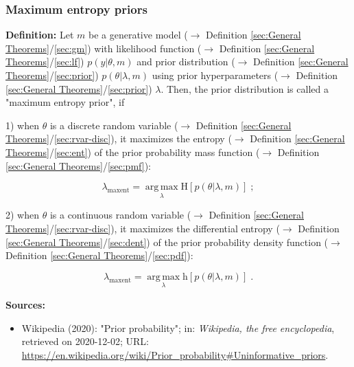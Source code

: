 \documentclass[a4paper,12pt,twoside]{book}
\begin{document}
\subsubsection[\textit{Maximum entropy priors}]{Maximum entropy priors} \label{sec:prior-maxent}
\setcounter{equation}{0}

\textbf{Definition:} Let $m$ be a generative model ($\rightarrow$ Definition \ref{sec:General Theorems}/\ref{sec:gm}) with likelihood function ($\rightarrow$ Definition \ref{sec:General Theorems}/\ref{sec:lf}) $p(y \vert \theta, m)$ and prior distribution ($\rightarrow$ Definition \ref{sec:General Theorems}/\ref{sec:prior}) $p(\theta \vert \lambda, m)$ using prior hyperparameters ($\rightarrow$ Definition \ref{sec:General Theorems}/\ref{sec:prior}) $\lambda$. Then, the prior distribution is called a "maximum entropy prior", if

1) when $\theta$ is a discrete random variable ($\rightarrow$ Definition \ref{sec:General Theorems}/\ref{sec:rvar-disc}), it maximizes the entropy ($\rightarrow$ Definition \ref{sec:General Theorems}/\ref{sec:ent}) of the prior probability mass function ($\rightarrow$ Definition \ref{sec:General Theorems}/\ref{sec:pmf}):

\begin{equation} \label{eq:prior-maxent-prior-maxent-disc}
\lambda_{\mathrm{maxent}} = \operatorname*{arg\,max}_{\lambda} \mathrm{H}\left[ p(\theta \vert \lambda, m) \right] \; ;
\end{equation}

2) when $\theta$ is a continuous random variable ($\rightarrow$ Definition \ref{sec:General Theorems}/\ref{sec:rvar-disc}), it maximizes the differential entropy ($\rightarrow$ Definition \ref{sec:General Theorems}/\ref{sec:dent}) of the prior probability density function ($\rightarrow$ Definition \ref{sec:General Theorems}/\ref{sec:pdf}):

\begin{equation} \label{eq:prior-maxent-prior-maxent-cont}
\lambda_{\mathrm{maxent}} = \operatorname*{arg\,max}_{\lambda} \mathrm{h}\left[ p(\theta \vert \lambda, m) \right] \; .
\end{equation}


\vspace{1em}
\textbf{Sources:}
\begin{itemize}
\item Wikipedia (2020): "Prior probability"; in: \textit{Wikipedia, the free encyclopedia}, retrieved on 2020-12-02; URL: \url{https://en.wikipedia.org/wiki/Prior_probability#Uninformative_priors}.
\end{itemize}
\end{document}
